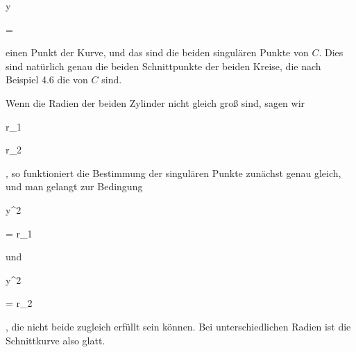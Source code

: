 {{\vergleichskette

{ y
}

{ = }{ 
}

{  }{
}

{    }{
}

{   }{
}

}
{}{}{}
einen Punkt der Kurve, und das sind die beiden singulären Punkte von $C$. Dies sind natürlich genau die beiden Schnittpunkte der beiden Kreise, die nach
Beispiel 4.6
die
von $C$ sind.


Wenn die Radien der beiden Zylinder nicht gleich groß sind, sagen wir


\mavergleichskette

{\vergleichskette

{r_1
}

{ \neq }{ r_2
}

{  }{
}

{    }{
}

{   }{
}

}
{}{}{,}
so funktioniert die Bestimmung der singulären Punkte zunächst genau gleich, und man gelangt zur Bedingung


\mavergleichskette

{\vergleichskette

{ y^2
}

{ = }{ r_1
}

{  }{
}

{    }{
}

{   }{
}

}
{}{}{}
und


\mavergleichskette

{\vergleichskette

{ y^2
}

{ = }{ r_2
}

{  }{
}

{    }{
}

{   }{
}

}
{}{}{,}
die nicht beide zugleich erfüllt sein können. Bei unterschiedlichen Radien ist die Schnittkurve also glatt.


}





{}

